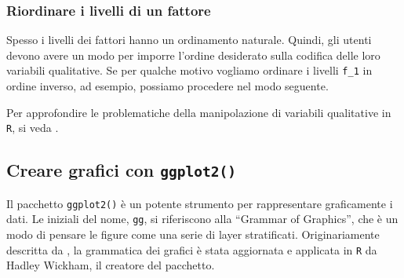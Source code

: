 \documentclass[
  10pt,
  italian,
  a4paper,
  extrafontsizes,onecolumn,openright
  ]{memoir}
\newenvironment{Shaded}{\begin{snugshade}}{\end{snugshade}}
\newcommand{\AttributeTok}[1]{\textcolor[rgb]{0.77,0.63,0.00}{#1}}
\newcommand{\CommentTok}[1]{\textcolor[rgb]{0.56,0.35,0.01}{\textit{#1}}}
\newcommand{\FunctionTok}[1]{\textcolor[rgb]{0.00,0.00,0.00}{#1}}
\newcommand{\NormalTok}[1]{#1}
\newcommand{\OtherTok}[1]{\textcolor[rgb]{0.56,0.35,0.01}{#1}}
\newcommand{\SpecialCharTok}[1]{\textcolor[rgb]{0.00,0.00,0.00}{#1}}
\newcommand{\StringTok}[1]{\textcolor[rgb]{0.31,0.60,0.02}{#1}}
\begin{document}
\hypertarget{riordinare-i-livelli-di-un-fattore}{%
\subsubsection{Riordinare i livelli di un fattore}\label{riordinare-i-livelli-di-un-fattore}}

Spesso i livelli dei fattori hanno un ordinamento naturale. Quindi, gli utenti devono avere un modo per imporre l'ordine desiderato sulla codifica delle loro variabili qualitative. Se per qualche motivo vogliamo ordinare i livelli \texttt{f\_1} in ordine inverso, ad esempio, possiamo procedere nel modo seguente.

\begin{Shaded}
\end{Shaded}

\noindent
Per approfondire le problematiche della manipolazione di variabili qualitative in \texttt{R}, si veda \textcite{mcnamara2018wrangling}.

\hypertarget{creare-grafici-con-ggplot2}{%
\subsection{\texorpdfstring{Creare grafici con \texttt{ggplot2()}}{Creare grafici con ggplot2()}}\label{creare-grafici-con-ggplot2}}

Il pacchetto \texttt{ggplot2()} è un potente strumento per rappresentare graficamente i dati. Le iniziali del nome, \texttt{gg}, si riferiscono alla ``Grammar of Graphics'', che è un modo di pensare le figure come una serie di layer stratificati. Originariamente descritta da \textcite{wilkinson2012grammar}, la grammatica dei grafici è stata aggiornata e applicata in \texttt{R} da Hadley Wickham, il creatore del pacchetto.
\end{document}
